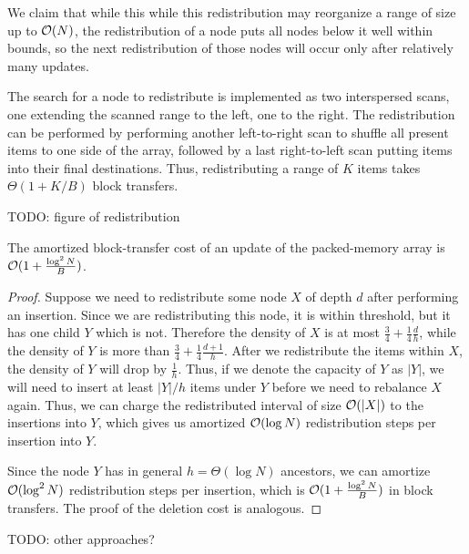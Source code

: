 We claim that while this while this redistribution may reorganize a range
of size up to $\mathcal{O}(N)$, the redistribution of a node puts all nodes below it
well within bounds, so the next redistribution of those nodes will occur
only after relatively many updates. %

The search for a node to redistribute is implemented as two interspersed scans,
one extending the scanned range to the left, one to the right. The
redistribution can be performed by performing another left-to-right scan to
shuffle all present items to one side of the array, followed by a last
right-to-left scan putting items into their final destinations. Thus,
redistributing a range of $K$ items takes $\Theta(1+K/B)$ block transfers.

TODO: figure of redistribution

\begin{theorem}
The amortized block-transfer cost of an update of the packed-memory array
is $\mathcal{O}(1+\frac{\log^2 N}{B})$.
\end{theorem}

\begin{proof}
Suppose we need to redistribute some node $X$ of depth $d$ after performing
an insertion. Since we are redistributing this node, it is within threshold,
but it has one child $Y$ which is not. Therefore the density of $X$ is at most
$\frac{3}{4}+\frac{1}{4}\frac{d}{h}$, while the density of $Y$ is more than
$\frac{3}{4}+\frac{1}{4}\frac{d+1}{h}$. After we redistribute the items within $X$,
the density of $Y$ will drop by $\frac{1}{h}$. Thus, if we denote the capacity
of $Y$ as $|Y|$, we will need to insert at least $|Y|/h$ items under $Y$ before
we need to rebalance $X$ again. Thus, we can charge the redistributed interval
of size $\mathcal{O}(|X|)$ to the insertions into $Y$, which gives us amortized $\mathcal{O}(\log N)$
redistribution steps per insertion into $Y$.

Since the node $Y$ has in general $h=\Theta(\log N)$ ancestors, we can amortize
$\mathcal{O}(\log^2 N)$ redistribution steps per insertion, which is
$\mathcal{O}(1+\frac{\log^2 N}{B})$ in block transfers. The proof of the deletion
cost is analogous.
\end{proof}

TODO: other approaches?
